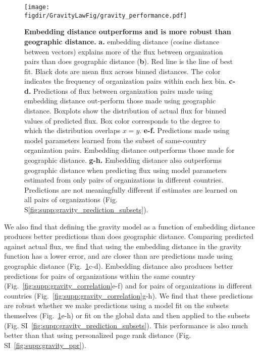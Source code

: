 \documentclass[12pt]{article} %
\def\figdir{../Figs}
\begin{document}
%
%
\begin{figure}[h!]
    \centering
    \label{fig:gravity_performance}
    \texttt{[image: \\figdir/GravityLawFig/gravity\_performance.pdf]}
    \caption{
        \textbf{Embedding distance outperforms and is more robust than geographic distance.}
        \textbf{a.} embedding distance (cosine distance between vectors) explains more of the flux between organization pairs than does geographic distance (\textbf{b}).
        Red line is the line of best fit.
        Black dots are mean flux across binned distances.
        The color indicates the frequency of organization pairs within each hex bin.
        \textbf{c-d.} Predictions of flux between organization pairs made using embedding distance out-perform those made using geographic distance.
        Boxplots show the distribution of actual flux for binned values of predicted flux.
        Box color corresponds to the degree to which the distribution overlaps $x = y$.
        \textbf{e-f.} Predictions made using model parameters learned from the subset of same-country organization pairs.
        Embedding distance outperforms those made for geographic distance.
        \textbf{g-h.} Embedding distance also outperforms geographic distance when predicting flux using model parameters estimated from only pairs of organizations in different countries.
        Predictions are not meaningfully different if estimates are learned on all pairs of organizations (Fig. S\ref{fig:supp:gravity_prediction_subsets}).
    }
\end{figure}

We also find that defining the gravity model as a function of embedding distance produces better predictions than does geographic distance.
Comparing predicted against actual flux, we find that using the embedding distance in the gravity function has a lower error, and are closer than are predictions made using geographic distance (Fig.~\ref{fig:gravity_performance}c-d).
Embedding distance also produces better predictions for pairs of organizations within the same country (Fig.~\ref{fig:supp:gravity_correlation}e-f) and for pairs of organizations in different countries (Fig.~\ref{fig:supp:gravity_correlation}g-h).
We find that these predictions are robust whether we make predictions using a model fit on the subsets themselves (Fig.~\ref{fig:gravity_performance}e-h) or fit on the global data and then applied to the subsets (Fig. SI~\ref{fig:supp:gravity_prediction_subsets}).
This performance is also much better than that using personalized page rank distance (Fig. SI~\ref{fig:supp:gravity_ppr}).
\end{document}
